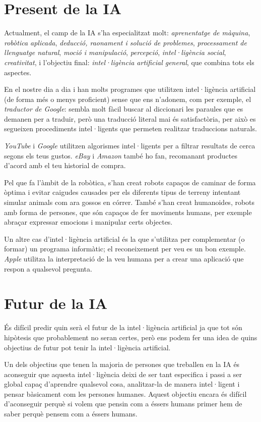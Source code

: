 \section {Present de la IA}
Actualment, el camp de la IA s'ha especialitzat molt: \emph{aprenentatge de màquina}, \emph{robòtica aplicada}, \emph{deducció, raonament i solució de problemes}, \emph{processament de llenguatge natural}, \emph{moció i manipulació}, \emph{percepció}, \emph{intel·ligència social}, \emph{creativitat}, i l'objectiu final: \emph{intel·ligència artificial general}, que combina tots els aspectes.

En el nostre dia a dia i han molts programes que utilitzen intel·ligència artificial (de forma més o menys proficient) sense que ens n'adonem, com per exemple, el \emph{traductor de Google}: sembla molt fàcil buscar al diccionari les paraules que es demanen per a traduir, però una traducció literal mai és satisfactòria, per això es segueixen procediments intel·ligents que permeten realitzar traduccions naturals.

\emph{YouTube} i \emph{Google} utilitzen algorismes intel·ligents per a filtrar resultats de cerca segons els teus gustos. \emph{eBay} i \emph{Amazon} també ho fan, recomanant productes d'acord amb el teu historial de compra.


Pel que fa l'àmbit de la robòtica, s'han creat robots capaços de caminar de forma òptima i evitar caigudes causades per els diferents tipus de terreny intentant simular animals com
ara gossos en córrer. També s'han creat humanoides, robots amb forma de persones, que són capaços de fer moviments humans, per exemple abraçar expressar emocions i manipular certs objectes. \cite{bostondynamics}


Un altre cas d'intel·ligència artificial és la que s'utilitza per complementar (o formar) un programa informàtic; el reconeixement per veu es un bon exemple. \emph{Apple} utilitza la interpretació de la veu humana per a crear una aplicació que respon a qualsevol pregunta.

\section {Futur de la IA}
És difícil predir quin serà el futur de la intel·ligència artificial ja que tot són hipòtesis que probablement no seran certes, però ens podem fer una idea de quins objectius de futur
pot tenir la intel·ligència artificial.

Un dels objectius que tenen la majoria de persones que treballen en la IA és aconseguir que aquesta intel·ligència deixi de ser tant especifica i passi a ser global capaç d'aprendre
qualsevol cosa, analitzar-la de manera intel·ligent i pensar bàsicament com les persones humanes. Aquest objectiu encara és difícil d'aconseguir perquè si volem que pensin com a éssers
humans primer hem de saber perquè pensem com a éssers humans.

